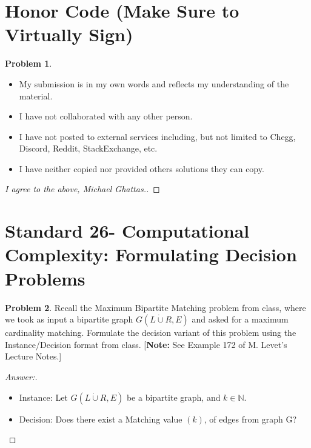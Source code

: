 \documentclass[11pt]{article}
\theoremstyle{definition}
\theoremstyle{definition}
\newtheorem{required}{Problem}
\theoremstyle{definition}
\begin{document}
\section{Honor Code (Make Sure to Virtually Sign)} \label{HonorCode}

\begin{required}
\noindent 
\begin{itemize}
\item My submission is in my own words and reflects my understanding of the material.
\item I have not collaborated with any other person.
\item I have not posted to external services including, but not limited to Chegg, Discord, Reddit, StackExchange, etc.
\item I have neither copied nor provided others solutions they can copy.
\end{itemize}

\end{required}

\begin{proof}[I agree to the above, Michael Ghattas.]
\end{proof}


\newpage
\section{Standard 26- Computational Complexity: Formulating Decision Problems}

\begin{required}
Recall the \textsf{Maximum Bipartite Matching} problem from class, where we took as input a bipartite graph $G(L \dot \cup R, E)$ and asked for a maximum cardinality matching. Formulate the decision variant of this problem using the \textsf{Instance}/\textsf{Decision} format from class. [\textbf{Note:} See Example 172 of M. Levet's Lecture Notes.]
\end{required}

\begin{proof}[Answer:] \
\begin{itemize}
\item \textsf{Instance:} Let  $G(L \dot \cup R, E)$ be a bipartite graph, and $k \in \mathbb{N}$.
\item \textsf{Decision:} Does there exist a Matching value $(k)$, of edges from graph G?
\end{itemize}

\end{proof}
\end{document}
